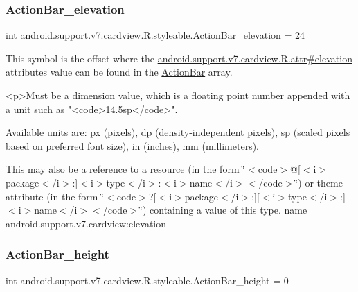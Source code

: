\subsubsection{\texorpdfstring{Action\+Bar\+\_\+elevation}{ActionBar\_elevation}}
{\footnotesize\ttfamily int android.\+support.\+v7.\+cardview.\+R.\+styleable.\+Action\+Bar\+\_\+elevation = 24\hspace{0.3cm}{\ttfamily [static]}}

This symbol is the offset where the \hyperlink{classandroid_1_1support_1_1v7_1_1cardview_1_1R_1_1attr_af8da2ee4ea221f8d413747edbfbf8ccb}{android.\+support.\+v7.\+cardview.\+R.\+attr\#elevation} attribute\textquotesingle{}s value can be found in the \hyperlink{classandroid_1_1support_1_1v7_1_1cardview_1_1R_1_1styleable_a0cbf7f776e31f78bb0a2b558daf176f8}{Action\+Bar} array.

\begin{DoxyVerb}      <p>Must be a dimension value, which is a floating point number appended with a unit such as "<code>14.5sp</code>".
\end{DoxyVerb}
 Available units are\+: px (pixels), dp (density-\/independent pixels), sp (scaled pixels based on preferred font size), in (inches), mm (millimeters). 

This may also be a reference to a resource (in the form \char`\"{}$<$code$>$@\mbox{[}$<$i$>$package$<$/i$>$\+:\mbox{]}$<$i$>$type$<$/i$>$\+:$<$i$>$name$<$/i$>$$<$/code$>$\char`\"{}) or theme attribute (in the form \char`\"{}$<$code$>$?\mbox{[}$<$i$>$package$<$/i$>$\+:\mbox{]}\mbox{[}$<$i$>$type$<$/i$>$\+:\mbox{]}$<$i$>$name$<$/i$>$$<$/code$>$\char`\"{}) containing a value of this type.  name android.\+support.\+v7.\+cardview\+:elevation \mbox{\label{classandroid_1_1support_1_1v7_1_1cardview_1_1R_1_1styleable_a74f979f83ff003dd9a26ebab6879a480}} 
\subsubsection{\texorpdfstring{Action\+Bar\+\_\+height}{ActionBar\_height}}
{\footnotesize\ttfamily int android.\+support.\+v7.\+cardview.\+R.\+styleable.\+Action\+Bar\+\_\+height = 0\hspace{0.3cm}{\ttfamily [static]}}

